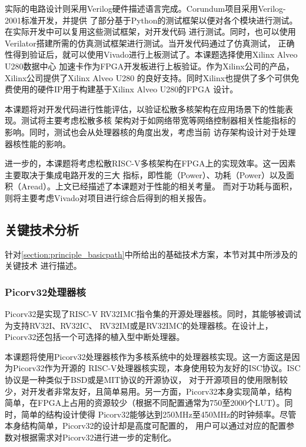 实际的电路设计则采用Verilog硬件描述语言完成。Corundum项目采用Verilog-2001标准开发，并提供
了部分基于Python的测试框架以便对各个模块进行测试。在实际开发中可以复用这些测试框架，对开发代码
进行测试。同时，也可以使用Verilator搭建所需的仿真测试框架进行测试。当开发代码通过了仿真测试，
正确性得到验证后，就可以使用Vivado进行上板测试了。本课题选择使用Xilinx Alveo U280数据中心
加速卡作为FPGA开发板进行上板验证。作为Xilinx公司的产品，Xilinx公司提供了Xilinx Alveo U280
的良好支持。同时Xilinx也提供了多个可供免费使用的硬件IP用于构建基于Xilinx Alveo U280的FPGA
设计。

本课题将对开发代码进行性能评估，以验证松散多核架构在应用场景下的性能表现。测试将主要考虑松散多核
架构对于如网络带宽等网络控制器相关性能指标的影响。同时，测试也会从处理器核的角度出发，考虑当前
访存架构设计对于处理器核性能的影响。

进一步的，本课题将考虑松散RISC-V多核架构在FPGA上的实现效率。这一因素主要取决于集成电路开发的三大
指标，即性能（Power）、功耗（Power）以及面积（Aread）。上文已经描述了本课题对于性能的相关考量。
而对于功耗与面积，则将主要考虑Vivado对项目进行综合后得到的相关报告。

\subsection{关键技术分析}

针对\autoref{section:principle_basicpath}中所给出的基础技术方案，本节对其中所涉及的关键技术
进行描述。

\subsubsection{Picorv32处理器核}
\label{section:principle_picorv32}

Picorv32是实现了RISC-V RV32IMC指令集的开源处理器核。同时，其能够被调试为支持RV32I、RV32IC、
RV32IM或是RV32IMC的处理器核。在设计上，Picorv32还包括一个可选择的植入型中断处理器\cite{picorv32}。

本课题将使用Picorv32处理器核作为多核系统中的处理器核实现。这一方面这是因为Picorv32作为开源的
RISC-V处理器核实现，本身使用较为友好的ISC协议。ISC协议是一种类似于BSD或是MIT协议的开源协议，
对于开源项目的使用限制较少，对开发者非常友好，且简单易用。另一方面，Picorv32本身实现简单，结构
简单，在FPGA上占用的资源较少（根据不同配置通常为750至2000个LUT）。同时，简单的结构设计使得
Picorv32能够达到250MHz至450MHz的时钟频率。尽管本身结构简单，Picorv32的设计却是高度可配置的，
用户可以通过对应的配置参数对根据需求对Picorv32进行进一步的定制化。

